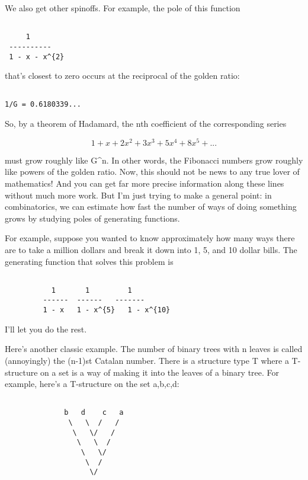 We also get other spinoffs.  For example, the pole of this function


\begin{verbatim}

     1
 ---------- 
 1 - x - x^{2}
\end{verbatim}
    
that's closest to zero occurs at the reciprocal of the golden ratio:


\begin{verbatim}

1/G = 0.6180339...
\end{verbatim}
    
So, by a theorem of Hadamard, the nth coefficient of the corresponding
series


$$

1 + x + 2x^{2} + 3x^{3} + 5x^{4} + 8x^{5} + ...
$$
    
must grow roughly like G^{n}.  In other words, the Fibonacci numbers grow
roughly like powers of the golden ratio.  Now, this should not be news
to any true lover of mathematics!  And you can get far more precise
information along these lines without much more work.  But I'm just
trying to make a general point: in combinatorics, we can estimate how
fast the number of ways of doing something grows by studying poles of
generating functions.

For example, suppose you wanted to know approximately how many ways
there are to take a million dollars and break it down into 1, 5, and
10 dollar bills.  The generating function that solves this problem is


\begin{verbatim}

           1       1         1
         ------  ------   -------
         1 - x   1 - x^{5}   1 - x^{10}
\end{verbatim}
    
I'll let you do the rest.  

Here's another classic example.  The number of binary trees with n leaves 
is called (annoyingly) the (n-1)st Catalan number.  There is a structure
type T where a T-structure on a set is a way of making it into the
leaves of a binary tree.  For example, here's a T-structure on the set
{a,b,c,d}:


\begin{verbatim}

              b   d    c   a
               \   \  /   /
                \   \/   /
                 \   \  /           
                  \   \/
                   \  /
                    \/
\end{verbatim}
    
